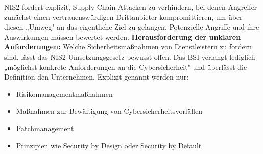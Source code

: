 NIS2 fordert explizit, Supply-Chain-Attacken zu verhindern, bei denen Angreifer zunächst einen vertrauenswürdigen Drittanbieter kompromittieren, um über diesen „Umweg" an das eigentliche Ziel zu gelangen. Potenzielle Angriffe und ihre Auswirkungen müssen bewertet werden.
\newpage
\textbf{Herausforderung der unklaren Anforderungen:} Welche Sicherheitsmaßnahmen von Dienstleistern zu fordern sind, lässt das NIS2-Umsetzungsgesetz bewusst offen. Das BSI verlangt lediglich „möglichst konkrete Anforderungen an die Cybersicherheit" und überlässt die Definition den Unternehmen. Explizit genannt werden nur:
\begin{itemize}
    \item Risikomanagementmaßnahmen
    \item Maßnahmen zur Bewältigung von Cybersicherheitsvorfällen
    \item Patchmanagement
    \item Prinzipien wie Security by Design oder Security by Default
\end{itemize}

